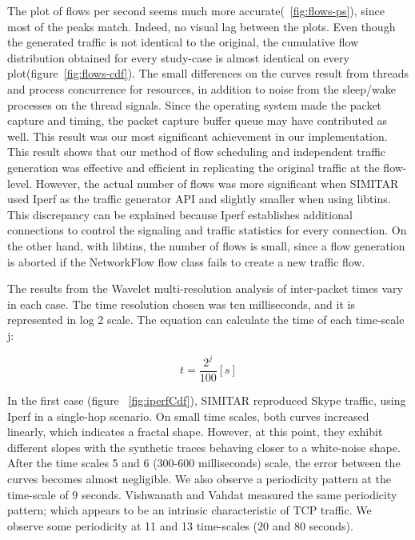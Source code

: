 The plot of flows per second seems much more accurate(~\ref{fig:flows-ps}), since most of the peaks match. Indeed, no visual lag between the plots. Even though the generated traffic is not identical to the original, the cumulative flow distribution obtained for every study-case is almost identical on every plot(figure~\ref{fig:flows-cdf}). The small differences on the curves result from threads and process concurrence for resources, in addition to noise from the sleep/wake processes on the thread signals. Since the operating system made the packet capture and timing, the packet capture buffer queue may have contributed as well. This result was our most significant achievement in our implementation. This result shows that our method of flow scheduling and independent traffic generation was effective and efficient in replicating the original traffic at the flow-level. However, the actual number of flows was more significant when SIMITAR used Iperf as the traffic generator API and slightly smaller when using libtins. This discrepancy can be explained because Iperf establishes additional connections to control the signaling and traffic statistics for every connection. On the other hand, with libtins, the number of flows is small, since a flow generation is aborted if the NetworkFlow flow class fails to create a new traffic flow. 

The results from the Wavelet multi-resolution analysis of inter-packet times vary in each case. The time resolution chosen was ten milliseconds, and it is represented in log 2 scale. The equation can calculate the time of each time-scale j: 

\begin{equation}
t = \frac{2^{j}}{100} [s]
\end{equation}

In the first case (figure ~\ref{fig:iperfCdf}), SIMITAR reproduced Skype traffic, using Iperf in a single-hop scenario. On small time scales, both curves increased linearly, which indicates a fractal shape. However, at this point, they exhibit different slopes with the synthetic traces behaving closer to a white-noise shape. After the time scales 5 and 6 (300-600 milliseconds) scale, the error between the curves becomes almost negligible. We also observe a periodicity pattern at the time-scale of 9 seconds. Vishwanath and Vahdat\cite{swing-paper}  measured the same periodicity pattern; which appears to be an intrinsic characteristic of  TCP traffic. We observe some periodicity at 11 and 13 time-scales (20 and 80 seconds). 


